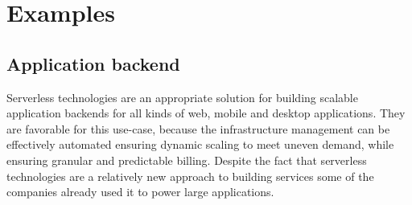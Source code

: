 

\section{Examples}



\subsection*{Application backend}


Serverless technologies are an appropriate solution for building scalable application backends for all kinds of web, mobile and desktop applications. They are favorable for this use-case, because the infrastructure management can be effectively automated ensuring dynamic scaling to meet uneven demand, while ensuring granular and predictable billing. Despite the fact that serverless technologies are a relatively new approach to building services some of the companies already used it to power large applications.

